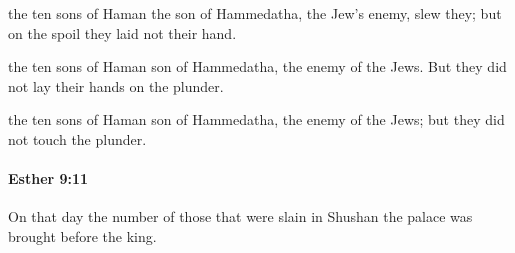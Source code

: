 			\begin{versebox}
					\item[BHS] 
					\item[LXX] 
					\item[ASV] the ten sons of Haman the son of Hammedatha, the Jew's enemy, slew they; but on the spoil they laid not their hand.
					\item[NIV] the ten sons of Haman son of Hammedatha, the enemy of the Jews. But they did not lay their hands on the plunder.
					\item[NRSV] the ten sons of Haman son of Hammedatha, the enemy of the Jews; but they did not touch the plunder.
			\end{versebox}

		\paragraph{Esther 9:11} %
			\label{ESTHER-9-11}

			On that day the number of those that were slain in Shushan the palace was brought before the king.

